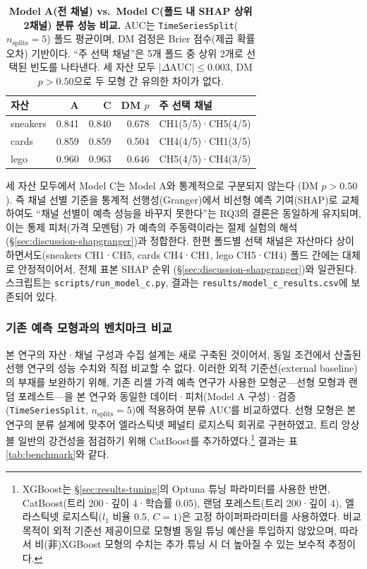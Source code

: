 \documentclass[11pt, a4paper, twocolumn]{article}
\begin{document}
\begin{table}[!t]
\centering\small
\caption[Model C(SHAP 선별) 검증 결과]{\textbf{Model A(전 채널) vs.\
Model C(폴드 내 SHAP 상위 2채널) 분류 성능 비교.} AUC는
\texttt{TimeSeriesSplit}($n_{\text{splits}}=5$) 폴드 평균이며, DM 검정은
Brier 점수(제곱 확률 오차) 기반이다. ``주 선택 채널''은 5개 폴드 중
상위 2개로 선택된 빈도를 나타낸다. 세 자산 모두
$|\Delta\mathrm{AUC}|\leq 0.003$, DM $p>0.50$으로 두 모형 간 유의한
차이가 없다.}
\label{tab:modelc}
\footnotesize
\setlength{\tabcolsep}{3.5pt}
\begin{tabular}{lrrrl}
\toprule
자산 & A & C & DM $p$ & 주 선택 채널 \\
\midrule
sneakers & 0.841 & 0.840 & 0.678 & CH1(5/5)·CH5(4/5) \\
cards    & 0.859 & 0.859 & 0.504 & CH4(4/5)·CH1(3/5) \\
lego     & 0.960 & 0.963 & 0.646 & CH5(4/5)·CH4(3/5) \\
\bottomrule
\end{tabular}
\end{table}

세 자산 모두에서 Model C는 Model A와 통계적으로 구분되지 않는다
(DM $p>0.50$). 즉 채널 선별 기준을 통계적 선행성(Granger)에서 비선형
예측 기여(SHAP)로 교체하여도 ``채널 선별이 예측 성능을 바꾸지
못한다''는 RQ3의 결론은 동일하게 유지되며, 이는 통제 피처(가격 모멘텀)
가 예측의 주동력이라는 절제 실험의 해석
(\S\ref{sec:discussion-shapgranger})과 정합한다. 한편 폴드별 선택
채널은 자산마다 상이하면서도(sneakers CH1·CH5, cards CH4·CH1, lego
CH5·CH4) 폴드 간에는 대체로 안정적이어서, 전체 표본 SHAP 순위
(\S\ref{sec:discussion-shapgranger})와 일관된다. 스크립트는
\texttt{scripts/run\_model\_c.py}, 결과는
\texttt{results/model\_c\_results.csv}에 보존되어 있다.

\subsubsection*{기존 예측 모형과의 벤치마크 비교}
\label{sec:results-benchmark}

본 연구의 자산·채널 구성과 수집 설계는 새로 구축된 것이어서, 동일
조건에서 산출된 선행 연구의 성능 수치와 직접 비교할 수 없다. 이러한
외적 기준선(external baseline)의 부재를 보완하기 위해, 기존 리셀 가격
예측 연구\citep{radityaetal2021}가 사용한 모형군---선형 모형과 랜덤
포레스트---을 본 연구와 동일한 데이터·피처(Model A 구성)·검증
(\texttt{TimeSeriesSplit}, $n_{\text{splits}}=5$)에 적용하여 분류
AUC를 비교하였다. 선형 모형은 본 연구의 분류 설계에 맞추어 엘라스틱넷
페널티 로지스틱 회귀로 구현하였고, 트리 앙상블 일반의 강건성을 점검하기
위해 CatBoost\citep{prokhorenkovaetal2018}를 추가하였다.\footnote{XGBoost는
\S\ref{sec:results-tuning}의 Optuna 튜닝 파라미터를 사용한 반면,
CatBoost(트리 200·깊이 4·학습률 0.05), 랜덤 포레스트(트리 200·깊이 4),
엘라스틱넷 로지스틱($l_1$ 비율 0.5, $C=1$)은 고정 하이퍼파라미터를
사용하였다. 비교 목적이 외적 기준선 제공이므로 모형별 동일 튜닝 예산을
투입하지 않았으며, 따라서 비(非)XGBoost 모형의 수치는 추가 튜닝 시 더
높아질 수 있는 보수적 추정이다.} 결과는 표 \ref{tab:benchmark}와 같다.
\end{document}
